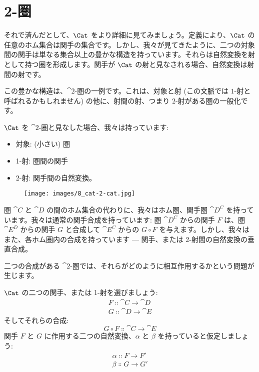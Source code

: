 \section{2-圏}

それで済んだとして、$\Cat$ をより詳細に見てみましょう。定義により、$\Cat$ の任意のホム集合は関手の集合です。しかし、我々が見てきたように、二つの対象間の関手は単なる集合以上の豊かな構造を持っています。それらは自然変換を射として持つ圏を形成します。関手が $\Cat$ の射と見なされる場合、自然変換は射間の射です。

この豊かな構造は、$\cat{2}$-圏の一例です。これは、対象と射 (この文脈では $1$-射と呼ばれるかもしれません) の他に、射間の射、つまり $2$-射がある圏の一般化です。

$\Cat$ を $\cat{2}$-圏と見なした場合、我々は持っています: 

\begin{itemize}
  \tightlist
  \item
        対象:  (小さい) 圏
  \item
        1-射: 圏間の関手
  \item
        2-射: 関手間の自然変換。
\end{itemize}

\begin{figure}[H]
  \centering
  \texttt{[image: images/8\_cat-2-cat.jpg]}
\end{figure}

\noindent
圏 $\cat{C}$ と $\cat{D}$ の間のホム集合の代わりに、我々はホム圏、関手圏 $\cat{D^C}$ を持っています。我々は通常の関手合成を持っています: 圏 $\cat{D^C}$ からの関手 $F$ は、圏 $\cat{E^D}$ からの関手 $G$ と合成して $\cat{E^C}$ からの $G \circ F$ を与えます。しかし、我々はまた、各ホム圏内の合成を持っています --- 関手、または 2-射間の自然変換の垂直合成。

二つの合成がある $\cat{2}$-圏では、それらがどのように相互作用するかという問題が生じます。

$\Cat$ の二つの関手、または 1-射を選びましょう: 
\begin{gather*}
  F \Colon \cat{C} \to \cat{D} \\
  G \Colon \cat{D} \to \cat{E}
\end{gather*}
そしてそれらの合成: 
\[G \circ F \Colon \cat{C} \to \cat{E}\]
関手 $F$ と $G$ に作用する二つの自然変換、$\alpha$ と $\beta$ を持っていると仮定しましょう: 
\begin{gather*}
  \alpha \Colon F \to F' \\
  \beta \Colon G \to G'
\end{gather*}

